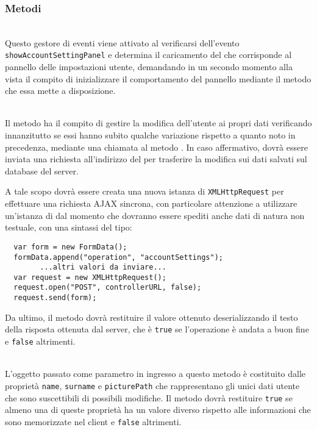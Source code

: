 \subsubsection*{Metodi}
\begin{description}

\item{}\\
Questo gestore di eventi viene attivato al verificarsi dell'evento \verb'showAccountSettingPanel' e determina il caricamento del  che corrisponde al pannello delle impostazioni utente, demandando in un secondo momento alla vista il compito di inizializzare il comportamento del pannello mediante il metodo  che essa mette a disposizione.

\item{}\\
Il metodo ha il compito di gestire la modifica dell'utente ai propri dati verificando innanzitutto se essi hanno subito qualche variazione rispetto a quanto noto in precedenza, mediante una chiamata al metodo . In caso affermativo, dovrà essere inviata una richiesta all'indirizzo del  per trasferire la modifica sui dati salvati sul database del server.

A tale scopo dovrà essere creata una nuova istanza di \verb'XMLHttpRequest' per effettuare una richiesta AJAX sincrona, con particolare attenzione a utilizzare un'istanza di  dal momento che dovranno essere spediti anche dati di natura non testuale, con una sintassi del tipo:
\begin{verbatim}
  var form = new FormData();
  formData.append("operation", "accountSettings");
        ...altri valori da inviare...
  var request = new XMLHttpRequest();
  request.open("POST", controllerURL, false);
  request.send(form);
\end{verbatim}

Da ultimo, il metodo dovrà restituire il valore ottenuto deserializzando il testo della risposta ottenuta dal server, che è \verb'true' se l'operazione è andata a buon fine e \verb'false' altrimenti.

\item{}\\
L'oggetto passato come parametro in ingresso a questo metodo è costituito dalle proprietà \verb'name', \verb'surname' e \verb'picturePath' che rappresentano gli unici dati utente che sono suscettibili di possibili modifiche. Il metodo dovrà restituire \verb'true' se almeno una di queste proprietà ha un valore diverso rispetto alle informazioni che sono memorizzate nel client  e \verb'false' altrimenti.

\end{description}


